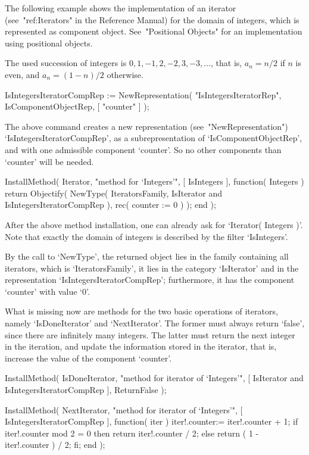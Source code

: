 The following example shows the implementation of an iterator
(see~"ref:Iterators" in the Reference Manual) for the domain of integers,
which is represented as component object.
See~"Positional Objects" for an implementation using positional objects.

The used succession of integers is $0, 1, -1, 2, -2, 3, -3, \ldots$,
that is, $a_n = n/2$ if $n$ is even,
and $a_n = (1-n)/2$ otherwise.

\begintt
IsIntegersIteratorCompRep := NewRepresentation( "IsIntegersIteratorRep",
    IsComponentObjectRep, [ "counter" ] );
\endtt

The above command creates a new representation (see~"NewRepresentation")
`IsIntegersIteratorCompRep',
as a subrepresentation of `IsComponentObjectRep',
and with one admissible component `counter'.
So no other components than `counter' will be needed.

\begintt
InstallMethod( Iterator,
    "method for `Integers'",
    [ IsIntegers ],
    function( Integers )
    return Objectify( NewType( IteratorsFamily,
                                   IsIterator
                               and IsIntegersIteratorCompRep ),
                      rec( counter := 0 ) );
    end );
\endtt

After the above method installation, one can already ask for
`Iterator( Integers )'.
Note that exactly the domain of integers is described by
the filter `IsIntegers'.

By the call to `NewType', the returned object lies in the family
containing all iterators, which is `IteratorsFamily',
it lies in the category `IsIterator' and in the representation
`IsIntegersIteratorCompRep';
furthermore, it has the component `counter' with value `0'.

What is missing now are methods for the two basic operations
of iterators, namely `IsDoneIterator' and `NextIterator'.
The former must always return `false', since there are infinitely
many integers.
The latter must return the next integer in the iteration,
and update the information stored in the iterator,
that is, increase the value of the component `counter'.

\begintt
InstallMethod( IsDoneIterator,
    "method for iterator of `Integers'",
    [ IsIterator and IsIntegersIteratorCompRep ],
    ReturnFalse );

InstallMethod( NextIterator,
    "method for iterator of `Integers'",
    [ IsIntegersIteratorCompRep ],
    function( iter )
    iter!.counter:= iter!.counter + 1;
    if iter!.counter mod 2 = 0 then
      return iter!.counter / 2;
    else
      return ( 1 - iter!.counter ) / 2;
    fi;
    end );
\endtt

